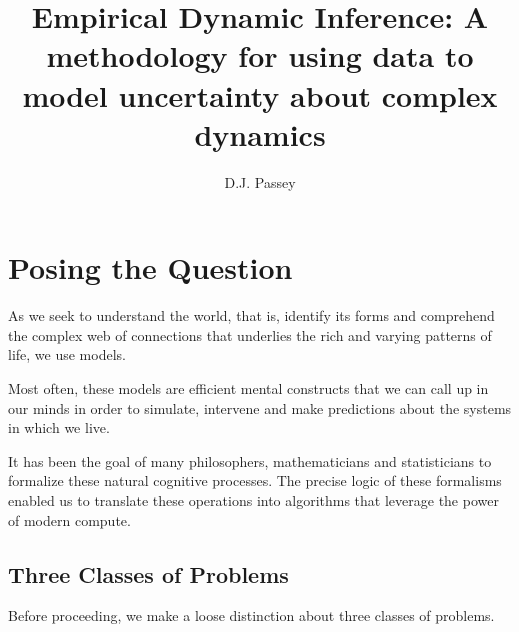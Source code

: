 \documentclass{article}
\title{Empirical Dynamic Inference: A  methodology for using data to model uncertainty about complex dynamics}
\author{D.J. Passey}
\begin{document}
\maketitle

\section{Posing the Question}
As we seek to understand the world, that is, identify its forms and comprehend the complex web of connections
that underlies the rich and varying patterns of life, we use models.

Most often, these models are efficient mental constructs that we can call up in our minds in order to simulate,
intervene and make predictions about the systems in which we live.

It has been the goal of many philosophers, mathematicians and statisticians to formalize these natural
cognitive processes. The precise logic of these formalisms enabled us to translate these operations into
algorithms that leverage the power of modern compute.

\subsection{Three Classes of Problems}

Before proceeding, we make a loose distinction about three classes of problems.
\end{document}
